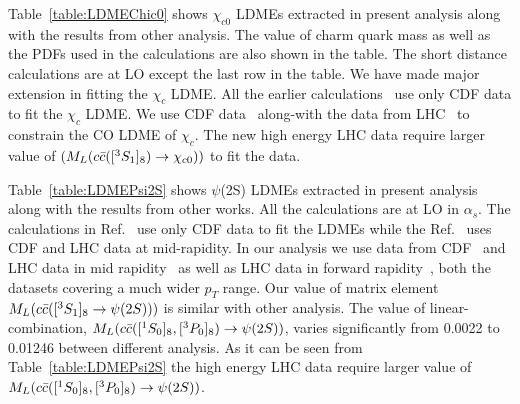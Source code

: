 \documentclass[aps,prc,preprint,superscriptaddress,showpacs,showkeys,amsmath]{revtex4-1}
\begin{document}




Table~\ref{table:LDMEChic0} shows $\chi_{c0}$ LDMEs extracted in present analysis along with the results from other
analysis. The value of charm quark mass as well as the PDFs used in the calculations are also shown in the table.
The short distance calculations are at LO except the last row in the table. We have made major extension in fitting
the $\chi_{c}$ LDME. All the earlier calculations~\cite{Cho:1995vh,Braaten:1999qk,Sharma:2012dy} use only CDF data to
fit the $\chi_{c}$ LDME. We use CDF data~\cite{Abe:1997yz} along-with the data from LHC~\cite{ATLAS:2014ala,Chatrchyan:2012ub,Aaij:2013dja} 
to constrain the CO LDME of $\chi_{c}$. The new high energy LHC data require larger value of $(M_{L}(c{\bar{c}}([^3S_1]_{8})\rightarrow \chi_{c0}))$ to fit the data.  

Table~\ref{table:LDMEPsi2S} shows $\psi$(2S) LDMEs extracted in present analysis along with the results from other 
works. All the calculations are at LO in $\alpha_{s}$. The calculations in Ref.~\cite{Cho:1995vh,Braaten:1999qk,Beneke:1996yw} use only 
CDF data to fit the LDMEs while the Ref.~\cite{Sharma:2012dy} uses CDF and LHC data at mid-rapidity. In our analysis we use data from
CDF~\cite{Abe:1997jz,Acosta:2004yw} and LHC data in mid rapidity~\cite{Chatrchyan:2011kc,Khachatryan:2015rra,Aad:2015duc} as well 
as LHC data in forward rapidity~\cite{Aaij:2012ag}, both the datasets covering a much wider $p_T$ range. Our value of matrix 
element $M_{L}(c{\bar{c}}([^3S_1]_{8}\rightarrow \psi(2S)))$ is similar with other analysis. The value of linear-combination, 
$M_{L}(c{\bar{c}}([^1S_0]_{8},[^3P_0]_{8})\rightarrow \psi(2S))$, varies significantly from 0.0022 to
0.01246 between different analysis. As it can be seen from Table~\ref{table:LDMEPsi2S} the high energy LHC data require larger value of
$M_{L}(c{\bar{c}}([^1S_0]_{8},[^3P_0]_{8})\rightarrow \psi(2S))$.    
\end{document}
